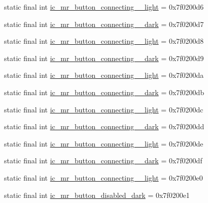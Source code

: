 \begin{CompactItemize}
static final int \hyperlink{classandroid_1_1support_1_1v7_1_1mediarouter_1_1_r_1_1drawable_d2198dce8eef8b4e0773ab1817c64cc7}{ic\_\-mr\_\-button\_\-connecting\_\_\-light} = 0x7f0200d6
\item 
static final int \hyperlink{classandroid_1_1support_1_1v7_1_1mediarouter_1_1_r_1_1drawable_e28d61944b54ee4f46105a8073dcebb2}{ic\_\-mr\_\-button\_\-connecting\_\_\-dark} = 0x7f0200d7
\item 
static final int \hyperlink{classandroid_1_1support_1_1v7_1_1mediarouter_1_1_r_1_1drawable_31a313937cd95b06c535e2fef8495a03}{ic\_\-mr\_\-button\_\-connecting\_\_\-light} = 0x7f0200d8
\item 
static final int \hyperlink{classandroid_1_1support_1_1v7_1_1mediarouter_1_1_r_1_1drawable_72181430d52e9718c4318e95761aab7f}{ic\_\-mr\_\-button\_\-connecting\_\_\-dark} = 0x7f0200d9
\item 
static final int \hyperlink{classandroid_1_1support_1_1v7_1_1mediarouter_1_1_r_1_1drawable_0d19b7084acc5c0c7bafd61b15942336}{ic\_\-mr\_\-button\_\-connecting\_\_\-light} = 0x7f0200da
\item 
static final int \hyperlink{classandroid_1_1support_1_1v7_1_1mediarouter_1_1_r_1_1drawable_50a3c83ec05c7591535bf3d158c95453}{ic\_\-mr\_\-button\_\-connecting\_\_\-dark} = 0x7f0200db
\item 
static final int \hyperlink{classandroid_1_1support_1_1v7_1_1mediarouter_1_1_r_1_1drawable_b34d8ebb278167e08c240f2e54826c92}{ic\_\-mr\_\-button\_\-connecting\_\_\-light} = 0x7f0200dc
\item 
static final int \hyperlink{classandroid_1_1support_1_1v7_1_1mediarouter_1_1_r_1_1drawable_05d0892d3debdae923df890edc748d23}{ic\_\-mr\_\-button\_\-connecting\_\_\-dark} = 0x7f0200dd
\item 
static final int \hyperlink{classandroid_1_1support_1_1v7_1_1mediarouter_1_1_r_1_1drawable_5666cd02a690d61da7fba6e365ce44f8}{ic\_\-mr\_\-button\_\-connecting\_\_\-light} = 0x7f0200de
\item 
static final int \hyperlink{classandroid_1_1support_1_1v7_1_1mediarouter_1_1_r_1_1drawable_5d755afa93ea16057803594262d15946}{ic\_\-mr\_\-button\_\-connecting\_\_\-dark} = 0x7f0200df
\item 
static final int \hyperlink{classandroid_1_1support_1_1v7_1_1mediarouter_1_1_r_1_1drawable_4f5a68ff4b3bd477e46079c7aab24b6a}{ic\_\-mr\_\-button\_\-connecting\_\_\-light} = 0x7f0200e0
\item 
static final int \hyperlink{classandroid_1_1support_1_1v7_1_1mediarouter_1_1_r_1_1drawable_01dfd45dad997711fb4cb4910d893502}{ic\_\-mr\_\-button\_\-disabled\_\-dark} = 0x7f0200e1

\end{CompactItemize}
